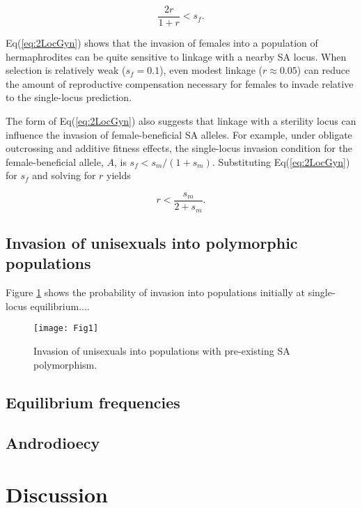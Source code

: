 \documentclass[9pt,twocolumn,twoside,lineno]{gsajnl}
\begin{document}
\begin{equation}\label{eq:2LocGyn}
	\frac{2 r}{1 + r} < s_f.
\end{equation}

\noindent Eq(\ref{eq:2LocGyn}) shows that the invasion of females into a population of hermaphrodites can be quite sensitive to linkage with a nearby SA locus. When selection is relatively weak ($s_f = 0.1$), even modest linkage ($r\approx0.05$) can reduce the amount of reproductive compensation necessary for females to invade relative to the single-locus prediction. 

The form of Eq(\ref{eq:2LocGyn}) also suggests that linkage with a sterility locus can influence the invasion of female-beneficial SA alleles. For example, under obligate outcrossing and additive fitness effects, the single-locus invasion condition for the female-beneficial allele, $A$, is $s_f < s_m / (1+s_m)$. Substituting Eq(\ref{eq:2LocGyn}) for $s_f$ and solving for $r$ yields

\begin{equation}\label{eq:2LocGynSA}
	r < \frac{s_m}{2 + s_m}.
\end{equation}




\subsection{Invasion of unisexuals into polymorphic populations}

Figure \ref{fig:PrInv} shows the probability of invasion into populations initially at single-locus equilibrium....

\begin{figure}[htbp]
\centering
\texttt{[image: Fig1]}
\caption{Invasion of unisexuals into populations with pre-existing SA polymorphism. }
\label{fig:PrInv}
\end{figure}


\subsection{Equilibrium frequencies}

\subsection{Androdioecy}

\section{Discussion}
\end{document}
